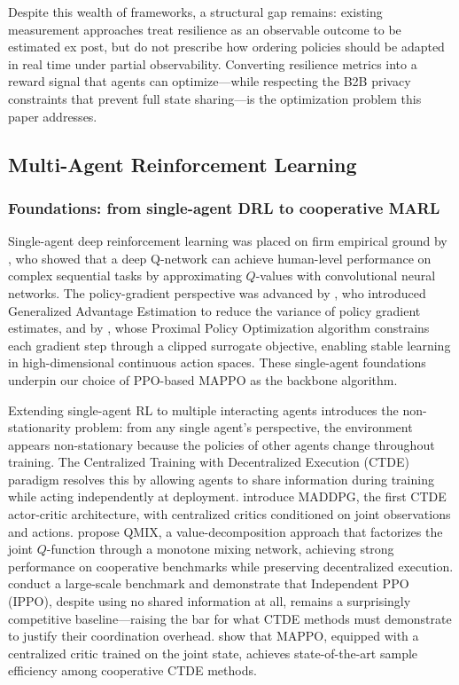 \documentclass[11pt,a4paper]{article}
\theoremstyle{plain}
\theoremstyle{definition}
\begin{document}
Despite this wealth of frameworks, a structural gap remains: existing measurement
approaches treat resilience as an observable outcome to be estimated ex post, but do not
prescribe how ordering policies should be adapted in real time under partial observability.
Converting resilience metrics into a reward signal that agents can optimize---while
respecting the B2B privacy constraints that prevent full state sharing---is the optimization
problem this paper addresses.

\subsection{Multi-Agent Reinforcement Learning}

\subsubsection*{Foundations: from single-agent DRL to cooperative MARL}

Single-agent deep reinforcement learning was placed on firm empirical ground by
\citet{mnih2015human}, who showed that a deep Q-network can achieve human-level performance
on complex sequential tasks by approximating $Q$-values with convolutional neural networks.
The policy-gradient perspective was advanced by \citet{schulman2016high}, who introduced
Generalized Advantage Estimation to reduce the variance of policy gradient estimates, and
by \citet{schulman2017proximal}, whose Proximal Policy Optimization algorithm constrains
each gradient step through a clipped surrogate objective, enabling stable learning in
high-dimensional continuous action spaces.  These single-agent foundations underpin our
choice of PPO-based MAPPO as the backbone algorithm.

Extending single-agent RL to multiple interacting agents introduces the non-stationarity
problem: from any single agent's perspective, the environment appears non-stationary because
the policies of other agents change throughout training.  The Centralized Training with
Decentralized Execution (CTDE) paradigm resolves this by allowing agents to share information
during training while acting independently at deployment.  \citet{lowe2017multi} introduce
MADDPG, the first CTDE actor-critic architecture, with centralized critics conditioned on
joint observations and actions.  \citet{rashid2018qmix} propose QMIX, a value-decomposition
approach that factorizes the joint $Q$-function through a monotone mixing network, achieving
strong performance on cooperative benchmarks while preserving decentralized execution.
\citet{papoudakis2021benchmarking} conduct a large-scale benchmark and demonstrate that
Independent PPO (IPPO), despite using no shared information at all, remains a surprisingly
competitive baseline---raising the bar for what CTDE methods must demonstrate to justify
their coordination overhead.  \citet{yu2022surprising} show that MAPPO, equipped with a
centralized critic trained on the joint state, achieves state-of-the-art sample efficiency
among cooperative CTDE methods.
\end{document}

